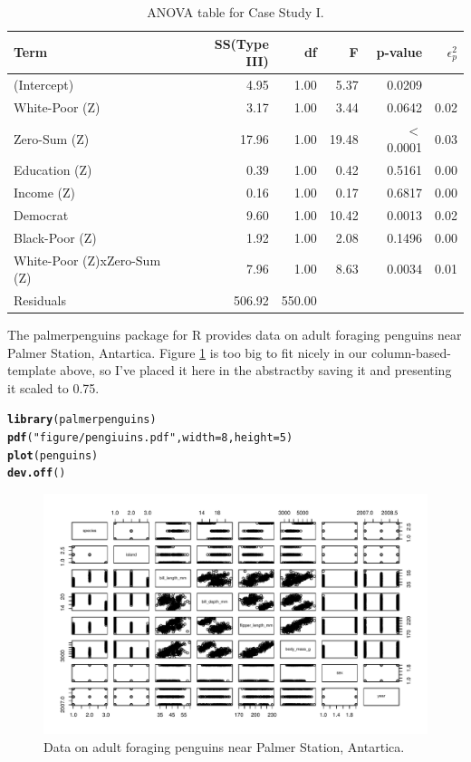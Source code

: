 \documentclass{article}\usepackage[]{graphicx}\usepackage[]{xcolor}
\makeatletter
\newcommand{\hlnum}[1]{\textcolor[rgb]{0.686,0.059,0.569}{#1}}%
\newcommand{\hlsng}[1]{\textcolor[rgb]{0.192,0.494,0.8}{#1}}%
\newcommand{\hldef}[1]{\textcolor[rgb]{0.345,0.345,0.345}{#1}}%
\newcommand{\hlkwc}[1]{\textcolor[rgb]{0.333,0.667,0.333}{#1}}%
\newcommand{\hlkwd}[1]{\textcolor[rgb]{0.737,0.353,0.396}{\textbf{#1}}}%
\newenvironment{kframe}{%
 \def\at@end@of@kframe{}%
 \ifinner\ifhmode%
  \def\at@end@of@kframe{\end{minipage}}%
  \begin{minipage}{\columnwidth}%
 \fi\fi%
 \def\FrameCommand##1{\hskip\@totalleftmargin \hskip-\fboxsep
 \colorbox{shadecolor}{##1}\hskip-\fboxsep
     \hskip-\linewidth \hskip-\@totalleftmargin \hskip\columnwidth}%
 \MakeFramed {\advance\hsize-\width
   \@totalleftmargin\z@ \linewidth\hsize
   \@setminipage}}%
 {\par\unskip\endMakeFramed%
 \at@end@of@kframe}
\newenvironment{knitrout}{}{} %
\makeatother
\begin{document}
 \begin{table}[H]
 \begin{center}
 \begin{tabular}{l r r r r r}\hline
 
 Term& SS(Type III)&  df&  F&  p-value&  $\epsilon_p^2$\\\hline
 
 (Intercept)&4.95&1.00&5.37&0.0209\\
 White-Poor (Z)&3.17&1.00&3.44&0.0642&0.02\\
 Zero-Sum (Z)&17.96&1.00&19.48&$<$0.0001&0.03\\
 Education (Z)&0.39&1.00&0.42&0.5161&0.00\\
 Income (Z)&0.16&1.00&0.17&0.6817&0.00\\
 Democrat&9.60&1.00&10.42&0.0013&0.02\\
 Black-Poor (Z)&1.92&1.00&2.08&0.1496&0.00\\
 White-Poor (Z)xZero-Sum (Z)&7.96&1.00&8.63&0.0034&0.01\\
 Residuals&506.92&550.00\\\hline
 \end{tabular} \label{ANOVA table}
 \caption{ANOVA table for Case Study I.}
 \end{center}
 \end{table}



The palmerpenguins package for R \citep{penguins} provides data on adult foraging penguins near Palmer Station, Antartica. Figure \ref{plot3} is too big to fit nicely in our column-based-template above, so I've placed it here in the abstractby saving it and presenting it scaled to 0.75.

\begin{knitrout}\scriptsize
{}\color{fgcolor}\begin{kframe}
\begin{alltt}
\hlkwd{library}\hldef{(palmerpenguins)}
\hlkwd{pdf}\hldef{(}\hlsng{"figure/pengiuins.pdf"}\hldef{,} \hlkwc{width} \hldef{=} \hlnum{8}\hldef{,} \hlkwc{height} \hldef{=}\hlnum{5}\hldef{)}
\hlkwd{plot}\hldef{(penguins)}
\hlkwd{dev.off}\hldef{()}
\end{alltt}
\end{kframe}
\end{knitrout}

\begin{figure}[H]
  \begin{center}
  \includegraphics[scale=0.8]{figure/pengiuins.pdf}
  \caption{Data on adult foraging penguins near Palmer Station, Antartica.}
  \label{plot3}
  \end{center}
\end{figure}
\end{document}
